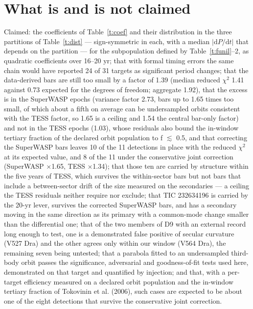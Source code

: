 \documentclass{aa}
\begin{document}
\section{What is and is not claimed}\label{s:claim}
Claimed: the coefficients of Table~\ref{t:coef} and their distribution in the three partitions of Table~\ref{t:dist} --- sign-symmetric in each, with a median $|\mathrm{d}P/\mathrm{d}t|$ that depends on the partition --- for the subpopulation defined by Table~\ref{t:funil}--2, as quadratic coefficients over 16--20 yr; that with formal timing errors the same chain would have reported 24 of 31 targets as significant period changes; that the data-derived bars are still too small by a factor of 1.39 (median reduced $\chi^2$ 1.41 against 0.73 expected for the degrees of freedom; aggregate 1.92), that the excess is in the SuperWASP epochs (variance factor 2.73, bars up to 1.65 times too small, of which about a fifth on average can be undersampled orbits consistent with the TESS factor, so 1.65 is a ceiling and 1.54 the central bar-only factor) and not in the TESS epochs (1.03), whose residuals also bound the in-window tertiary fraction of the declared orbit population to f $\lesssim$ 0.5, and that correcting the SuperWASP bars leaves 10 of the 11 detections in place with the reduced $\chi^2$ at its expected value, and 8 of the 11 under the conservative joint correction (SuperWASP $\times$1.65, TESS $\times$1.34); that those ten are carried by structure within the five years of TESS, which survives the within-sector bars but not bars that include a between-sector drift of the size measured on the secondaries --- a ceiling the TESS residuals neither require nor exclude; that TIC 232634196 is carried by the 20-yr lever, survives the corrected SuperWASP bars, and has a secondary moving in the same direction as its primary with a common-mode change smaller than the differential one; that of the two members of D9 with an external record long enough to test, one is a demonstrated false positive of secular curvature (V527 Dra) and the other agrees only within our window (V564 Dra), the remaining seven being untested; that a parabola fitted to an undersampled third-body orbit passes the significance, adversarial and goodness-of-fit tests used here, demonstrated on that target and quantified by injection; and that, with a per-target efficiency measured on a declared orbit population and the in-window tertiary fraction of Tokovinin et al. (2006), such cases are expected to be about one of the eight detections that survive the conservative joint correction.
\end{document}
